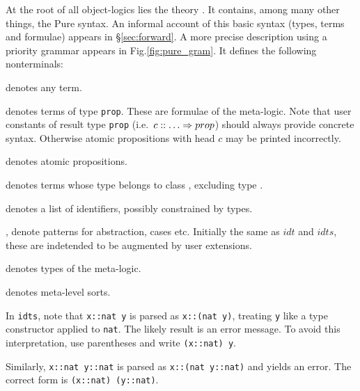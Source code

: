 At the root of all object-logics lies the theory .  It
contains, among many other things, the Pure syntax.  An informal account of
this basic syntax (types, terms and formulae) appears in
%
{\S\ref{sec:forward}}.  A more precise description using a priority grammar
appears in Fig.\ts\ref{fig:pure_gram}.  It defines the following
nonterminals:
\begin{ttdescription}
  \item[\ndxbold{any}] denotes any term.

  \item[\ndxbold{prop}] denotes terms of type {\tt prop}.  These are formulae
    of the meta-logic.  Note that user constants of result type {\tt prop}
    (i.e.\ $c :: \ldots \Rightarrow prop$) should always provide concrete syntax.
    Otherwise atomic propositions with head $c$ may be printed incorrectly.

  \item[\ndxbold{aprop}] denotes atomic propositions.


  \item[\ndxbold{logic}] denotes terms whose type belongs to class
    , excluding type .

  \item[\ndxbold{idts}] denotes a list of identifiers, possibly constrained
    by types.
    
  \item[\ndxbold{pttrn}, \ndxbold{pttrns}] denote patterns for
    abstraction, cases etc.  Initially the same as $idt$ and $idts$,
    these are indetended to be augmented by user extensions.

  \item[\ndxbold{type}] denotes types of the meta-logic.

  \item[\ndxbold{sort}] denotes meta-level sorts.
\end{ttdescription}

\begin{warn}
  In {\tt idts}, note that \verb|x::nat y| is parsed as \verb|x::(nat y)|,
  treating {\tt y} like a type constructor applied to {\tt nat}.  The
  likely result is an error message.  To avoid this interpretation, use
  parentheses and write \verb|(x::nat) y|.

  Similarly, \verb|x::nat y::nat| is parsed as \verb|x::(nat y::nat)| and
  yields an error.  The correct form is \verb|(x::nat) (y::nat)|.
\end{warn}

